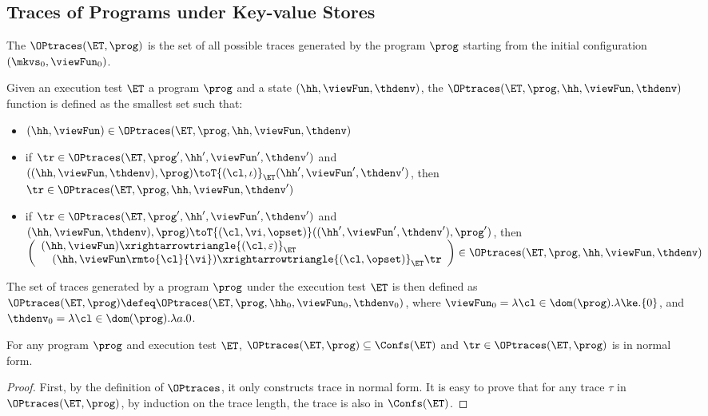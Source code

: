\subsection{Traces of Programs under Key-value Stores}
\label{sec:kv-sound-complete-theorem}

The \( \OPtraces(\ET, \prog) \) is the set of all possible traces generated by the program \( \prog \)
starting from the initial configuration \( ( \mkvs_0, \viewFun_0 ) \).

\begin{definition}
Given an execution test $\ET$ a program $\prog$ and a state 
$(\hh, \viewFun, \thdenv)$, the  $\OPtraces(\ET, \prog, \hh, \viewFun, \thdenv)$ function
is defined as the smallest set such that:
\begin{itemize}
\item $(\hh, \viewFun) \in \OPtraces(\ET, \prog, \hh, \viewFun, \thdenv)$
\item if $\tr \in \OPtraces(\ET, \prog', \hh', \viewFun',\thdenv')$
and $((\hh, \viewFun, \thdenv) , \prog) \toT{(\cl, \iota)}_{\ET} (\hh', \viewFun', \thdenv')$, 
then $\tr \in \OPtraces(\ET, \prog, \hh, \viewFun, \thdenv')$
\item if $\tr \in \OPtraces(\ET, \prog', \hh', \viewFun', \thdenv')$ and 
$(\hh, \viewFun, \thdenv), \prog) \toT{(\cl, \vi, \opset)} ((\hh', \viewFun', \thdenv'), \prog')$,  
then $
\left( 
\begin{array}{l}
(\hh, \viewFun) \xrightarrowtriangle{(\cl, \varepsilon)}_{\ET} \\
\quad (\hh, \viewFun\rmto{\cl}{\vi}) \xrightarrowtriangle{(\cl, \opset)}_{\ET} \tr 
\end{array}
\right) \in \OPtraces(\ET, \prog, \hh, \viewFun, \thdenv)
$
\end{itemize}
The set of traces generated by a program $\prog$ under the execution test $\ET$ is 
then defined as $\OPtraces(\ET, \prog) \defeq \OPtraces(\ET, \prog, \hh_{0}, \viewFun_{0}, \thdenv_{0})$, 
where $\viewFun_{0} = \lambda \cl \in \dom(\prog).\lambda \ke.\{0\}$, and 
$\thdenv_{0} = \lambda \cl \in \dom(\prog).\lambda a.0$.
\end{definition}


\begin{proposition}
\label{prop:program-trace-in-et-trace}
For any program $\prog$ and execution test $\ET$, 
$\OPtraces(\ET, \prog) \subseteq \Confs(\ET)$ and $\tr \in \OPtraces(\ET, \prog)$ is in normal form. 
\end{proposition}
\begin{proof}
    First, by the definition of \( \OPtraces \), 
    it only constructs trace in normal form.
    It is easy to prove that for any trace \( \tau \) in \( \OPtraces(\ET, \prog) \), by induction on the trace length,
    the trace is also in \( \Confs(\ET) \).
\end{proof}


